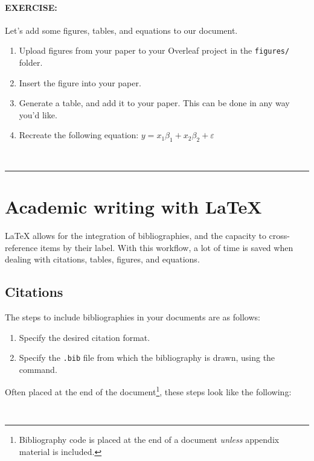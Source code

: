 \documentclass[11pt]{article}
\begin{document}
\paragraph{EXERCISE:} Let's add some figures, tables, and equations to our document.
\begin{enumerate}[noitemsep]
    \item Upload figures from your paper to your Overleaf project in the \verb|figures/| folder.
    \item Insert the figure into your paper.
    \item Generate a table, and add it to your paper. This can be done in any way you'd like.
    \item Recreate the following equation: $y = x_1\beta_1 + x_2\beta_2 + \varepsilon$
\end{enumerate}\\\vspace{0.7em}
\hrule


\section*{Academic writing with {\LaTeX}}

{\LaTeX} allows for the integration of bibliographies, and the capacity to cross-reference items by their label. With this workflow, a lot of time is saved when dealing with citations, tables, figures, and equations.

\subsection*{Citations}

The steps to include bibliographies in your documents are as follows:

\begin{enumerate}
    \item Specify the desired citation format.
    \item Specify the \texttt{.bib} file from which the bibliography is drawn, using the \verb|| command.
\end{enumerate}

\noindent Often placed at the end of the document\footnote{Bibliography code is placed at the end of a document \textit{unless} appendix material is included.}, these steps look like the following:

\begin{lstlisting}


\end{lstlisting}
\end{document}
